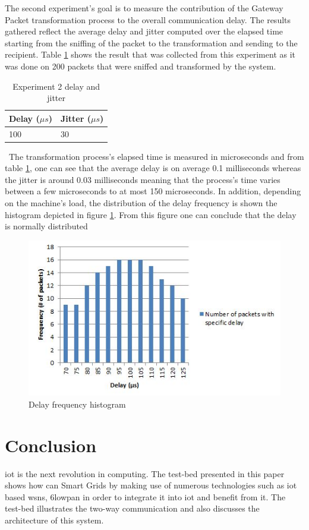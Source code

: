 \documentclass[conference]{IEEEtran}
\begin{document}
The second experiment's goal is to measure the contribution of the Gateway Packet transformation process to the overall communication delay. The results gathered reflect the average delay and jitter computed over the elapsed time starting from the sniffing of the packet to the transformation and sending to the recipient. Table \ref{table:exp2} shows the result that was collected from this experiment as it was done on 200 packets that were sniffed and transformed by the system.

\begin{table}[htbp]
    \begin{tabular}{ll}
    \hline
    Delay ($\mu s$) & Jitter ($\mu s$) \\ \hline
    100        &  30        \\ 
    \end{tabular}
    \caption{Experiment 2 delay and jitter}
        \label{table:exp2}
\end{table}

\
The transformation process's elapsed time is measured in microseconds and from table \ref{table:exp2}, one can see that the average delay is on average 0.1 milliseconds whereas the jitter is around 0.03 milliseconds meaning that the process's time varies between a few microseconds to at most 150 microseconds. In addition, depending on the machine's load, the distribution of the delay frequency is shown the histogram depicted in figure \ref{fig:histogram}. From this figure one can conclude that the delay is normally distributed
\begin{figure}[htbp]
 \centering
 \includegraphics[scale=0.7]{images/histogram.JPG}
 \caption{Delay frequency histogram}
 \label{fig:histogram}
 \end{figure}
\section{Conclusion}
\gls{iot} is the next revolution in computing. The test-bed presented in this paper shows how can Smart Grids by making use of numerous technologies such as \gls{iot} based \glspl{wsn}, \gls{6lowpan} in order to integrate it into \gls{iot} and benefit from it. The test-bed illustrates the two-way communication and also discusses the architecture of this system. 
\end{document}
